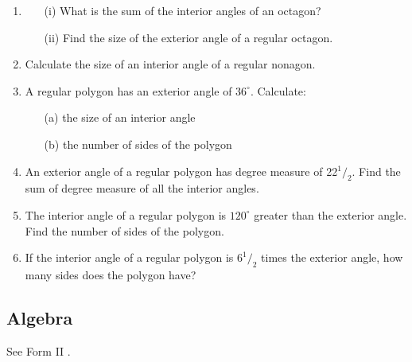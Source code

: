 \begin{enumerate}
		\item 
		\begin{itemize}
		\item[(i)] What is the sum of the interior angles of an octagon?
		\item[(ii)] Find the size of the exterior angle of a regular octagon.
		\end{itemize}
		
	\item Calculate the size of an interior angle of a regular nonagon.
	
	\item A regular polygon has an exterior angle of $36^\circ$. Calculate:
		\begin{itemize}
		\item[(a)] the size of an interior angle
		\item[(b)] the number of sides of the polygon
		\end{itemize}
	
	\item An exterior angle of a regular polygon has degree measure of 22$^1/_2$. Find the sum of degree measure of all the interior angles.
	
	\item The interior angle of a regular polygon is $120^\circ$ greater than the exterior angle. Find the number of sides of the polygon.
	
	\item If the interior angle of a regular polygon is $6^1/_2$ times the exterior angle, how many sides does the polygon have?


\end{enumerate}

	\subsection{Algebra}
	
	See Form II .


